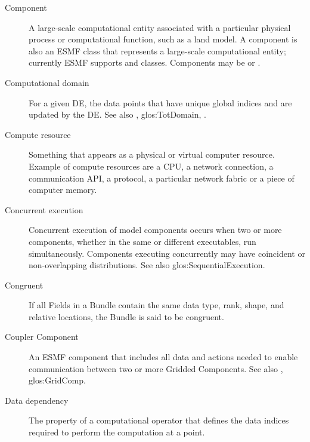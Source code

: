\begin{description}
\label{glos:Component}
\item[Component] A large-scale computational entity 
  associated with a particular physical process or computational function, 
  such as a land model.  A component is also an ESMF class that represents
  a large-scale computational entity; currently ESMF supports  and  classes.
  Components may be  or 
  .  

\label{glos:CompDomain}
\item[Computational domain] For a given DE, the data points that 
  have unique global indices and are updated by the DE.  
  See also , 
  {glos:TotDomain}, .

\label{glos:CompResource}
\item[Compute resource] Something that appears as a
  physical or virtual computer resource. Example of compute resources
  are a CPU, a network connection, a communication API, a protocol, a 
  particular network fabric or a piece of computer memory. 

\label{glos:ConcurrentExecution}
\item[Concurrent execution] 
  Concurrent execution of model components occurs when two or more components,
  whether in the same or different executables, run simultaneously.
  Components executing concurrently may have coincident or 
  non-overlapping distributions.  See also 
  {glos:SequentialExecution}.

\label{glos:Congruent}
\item[Congruent] 
  If all Fields in a Bundle contain the same data type, rank, shape, and 
  relative locations, the Bundle is said to be congruent. 

\label{glos:Coupler}
\item[Coupler Component]
  An ESMF component that includes all data and actions needed to enable 
  communication between two or more Gridded Components. 
  See also , 
  {glos:GridComp}.

\label{glos:DataDep}
\item[Data dependency] The property of a computational
  operator that defines the data indices required to perform
  the computation at a point.  


\end{description}

